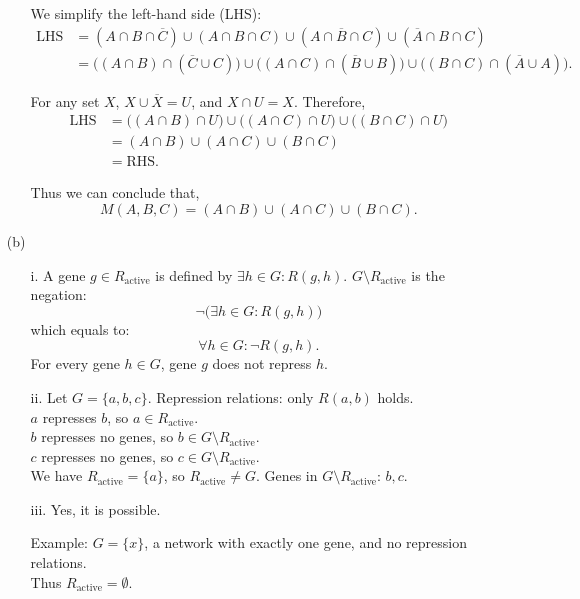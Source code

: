 \documentclass[12pt]{article}
\begin{document}
\begin{enumerate}
\begin{enumerate}
        We simplify the left-hand side (LHS):
        \begin{align*}
        \text{LHS}
        &= (A\cap B\cap\overline{C})
           \cup(A\cap B\cap C)
           \cup(A\cap\overline{B}\cap C)
           \cup(\overline{A}\cap B\cap C)\\
        &= \big((A\cap B)\cap(\overline{C}\cup C)\big)
           \cup\big((A\cap C)\cap(\overline{B}\cup B)\big)
           \cup\big((B\cap C)\cap(\overline{A}\cup A)\big).
        \end{align*}
        
        For any set $X$, $X\cup\overline{X}=U$, and $X\cap U=X$. Therefore,
        \begin{align*}
        \text{LHS}
        &= \big((A\cap B)\cap U\big)
           \cup\big((A\cap C)\cap U\big)
           \cup\big((B\cap C)\cap U\big)\\
        &= (A\cap B)\cup(A\cap C)\cup(B\cap C)\\
        &= \text{RHS}.
        \end{align*}
        
        Thus we can conclude that,
        \[
        M(A,B,C)
        =
        (A\cap B)\cup(A\cap C)\cup(B\cap C).
        \]
    \end{enumerate}

    \item[(b)]
    \begin{enumerate}
        \item [i.]
        A gene $g\in R_{\text{active}}$ is defined by $\exists h\in G: R(g,h)$.
        $G\setminus R_{\text{active}}$ is the negation:
        \[
        \neg\big(\exists h\in G: R(g,h)\big)
        \]
        which equals to:
        \[
        \forall h\in G: \neg R(g,h).
        \]
        For every gene $h\in G$, gene $g$ does not repress $h$.
        
        \item[ii.]
        Let $G=\{a,b,c\}$.
        Repression relations: only $R(a,b)$ holds.\\
        $a$ represses $b$, so $a\in R_{\text{active}}$.\\
        $b$ represses no genes, so $b\in G\setminus R_{\text{active}}$.\\
        $c$ represses no genes, so $c\in G\setminus R_{\text{active}}$.\\
        We have $R_{\text{active}}=\{a\}$, so $R_{\text{active}}\neq G$.
        Genes in $G\setminus R_{\text{active}}$: $b,c$.
        
        \item[iii.]
        Yes, it is possible.

        Example: $G=\{x\}$, a network with exactly one gene, and no repression relations.\\
        Thus $R_{\text{active}}=\emptyset$.
    \end{enumerate}
    
    
\end{enumerate}
\end{document}
